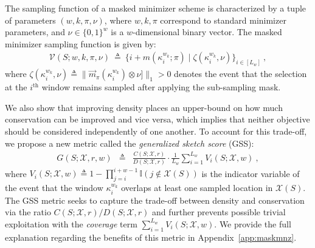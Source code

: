 \begin{definition} 
The sampling function of a masked minimizer scheme is characterized by a tuple of parameters $(w, k, \pi, \nu)$, where $w,k,\pi$ correspond to standard minimizer parameters, and $\nu\in\{0,1\}^w$ is a $w$-dimensional binary vector. The masked minimizer sampling function is given by:
\begin{eqnarray}
\mathcal{V}(S; w,k,\pi,\nu) \ \triangleq \ \{i + m(\kappa^{w_k}_i; \pi) \mid \zeta(\kappa^{w_k}_i, \nu)\}_{i\in[L_w]} \ ,
\end{eqnarray}
where $\zeta(\kappa^{w_k}_i, \nu) \triangleq \|\overrightarrow{m}_\pi(\kappa^{w_k}_i) \otimes \nu]\|_1 > 0$ denotes the event that the selection at the $i^{\text{th}}$ window remains sampled after applying the sub-sampling mask.
\end{definition}

\noindent We also show that improving density places an upper-bound on how much conservation can be improved and vice versa, which implies that neither objective should be considered independently of one another. To account for this trade-off, we propose a new metric called the \emph{generalized sketch score} (GSS):
\begin{eqnarray}
G(S; \mathcal{X}, r, w) &\triangleq& \frac{C(S;\mathcal{X},r)}{D(S;\mathcal{X},r)} \cdot \frac{1}{L_w} \sum_{i=1}^{L_w} V_i(S; \mathcal{X}, w) \ ,
\end{eqnarray}
where $V_i(S;\mathcal{X}, w) \triangleq 1 - \prod_{j=i}^{i+w-1} \mathbb{I}(j \not\in \mathcal{X}(S))$ is the indicator variable of the event that the window $\kappa^{w_k}_i$ overlaps at least one sampled location in $\mathcal{X}(S)$. The GSS metric seeks to capture the trade-off between density and conservation via the ratio $C(S;\mathcal{X}, r)/D(S;\mathcal{X},r)$ and further prevents possible trivial exploitation with the \emph{coverage} term $\sum_{i=1}^{L_w} V_i(S; \mathcal{X}, w)$. We provide the full explanation regarding the benefits of this metric in Appendix~\ref{app:maskmnz}.

